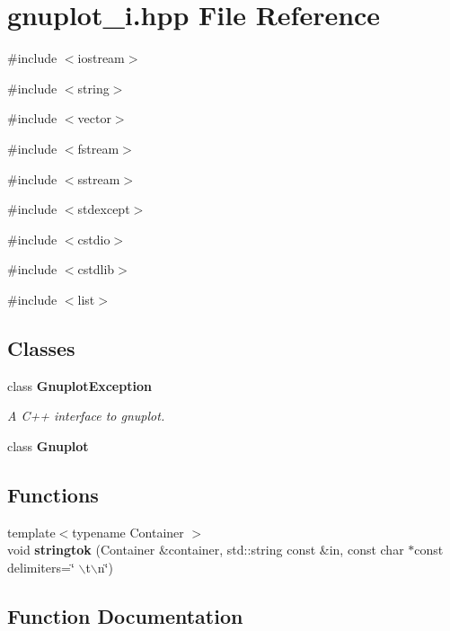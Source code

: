 \section{gnuplot\_\-i.hpp File Reference}
\label{d1/dd8/gnuplot__i_8hpp}
{\ttfamily \#include $<$iostream$>$}\par
{\ttfamily \#include $<$string$>$}\par
{\ttfamily \#include $<$vector$>$}\par
{\ttfamily \#include $<$fstream$>$}\par
{\ttfamily \#include $<$sstream$>$}\par
{\ttfamily \#include $<$stdexcept$>$}\par
{\ttfamily \#include $<$cstdio$>$}\par
{\ttfamily \#include $<$cstdlib$>$}\par
{\ttfamily \#include $<$list$>$}\par
\subsection*{Classes}
\begin{DoxyCompactItemize}
\item 
class {\bf GnuplotException}
\begin{DoxyCompactList}\small\item\em A C++ interface to gnuplot. \item\end{DoxyCompactList}\item 
class {\bf Gnuplot}
\end{DoxyCompactItemize}
\subsection*{Functions}
\begin{DoxyCompactItemize}
\item 
{\footnotesize template$<$typename Container $>$ }\\void {\bf stringtok} (Container \&container, std::string const \&in, const char $\ast$const delimiters=\char`\"{} $\backslash$t$\backslash$n\char`\"{})
\end{DoxyCompactItemize}


\subsection{Function Documentation}
